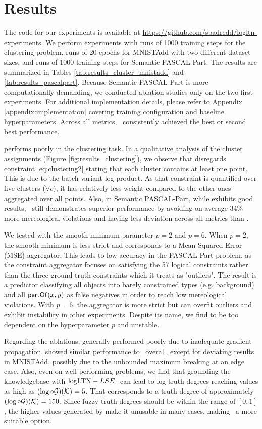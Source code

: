 \documentclass{article}
\theoremstyle{definition}
\begin{document}
\section{Results}
The code for our experiments is available at \url{https://github.com/sbadredd/logltn-experiments}.
We perform experiments with runs of 1000 training steps for the clustering problem, runs of 20 epochs for MNISTAdd with two different dataset sizes, and runs of 1000 training steps for Semantic PASCAL-Part.
The results are summarized in Tables \ref{tab:results_cluster_mnistadd} and \ref{tab:results_pascalpart}. 
Because Semantic PASCAL-Part is more computationally demanding, we conducted ablation studies only on the two first experiments.
For additional implementation details, please refer to Appendix \ref{appendix:implementation} covering training configuration and baseline hyperparameters.
Across all metrics, \logLTN\ consistently achieved the best or second best performance.

\ProdRL performs poorly in the clustering task.
In a qualitative analysis of the cluster assignments (Figure \ref{fig:results_clustering}), we observe that \ProdRL disregards constraint \eqref{eq:clustering2} stating that each cluster contains at least one point.
This is due to the batch-variant log-product. 
As that constraint is quantified over five clusters ($\forall c$), it has relatively less weight compared to the other ones aggregated over all points.
Also, in Semantic PASCAL-Part, while \ProdRL exhibits good results, \logLTN\ still demonstrates superior performance by avoiding on average 34\% more mereological violations and having less deviation across all metrics than \ProdRL.

We tested \StableRL with the smooth minimum parameter $p=2$ and $p=6$.
When $p=2$, the smooth minimum is less strict and corresponds to a Mean-Squared Error (MSE) aggregator. 
This leads to low accuracy in the PASCAL-Part problem, as the constraint aggregator focuses on satisfying the 57 logical constraints rather than the three ground truth constraints which it treats as "outliers".
The result is a predictor classifying all objects into barely constrained types (e.g. background) and all $\mathsf{partOf}(x,y)$ as false negatives in order to reach low mereological violations.
With $p=6$, the aggregator is more strict but can overfit outliers and exhibit instability in other experiments.
Despite its name, we find \StableRL to be too dependent on the hyperparameter $p$ and unstable.

Regarding the ablations, \logLTNmax generally performed poorly due to inadequate gradient propagation. 
\logLTNLSE showed similar performance to \logLTN\ overall, except for deviating results in MNISTAdd, possibly due to the unbounded maximum breaking at an edge case. 
Also, even on well-performing problems, we find that grounding the knowledgebase with $\textrm{logLTN}-LSE\ $ can lead to log truth degrees reaching values as high as $(\log\circ\mathcal{G})(\mathcal{K})=5$.
That corresponds to a truth degree of approximately $(\log\circ\mathcal{G})(\mathcal{K})=150$. 
Since fuzzy truth degrees should be within the range of $[0,1]$, the higher values generated by \logLTNLSE make it unusable in many cases, making \logLTN\ a more suitable option.
\end{document}
